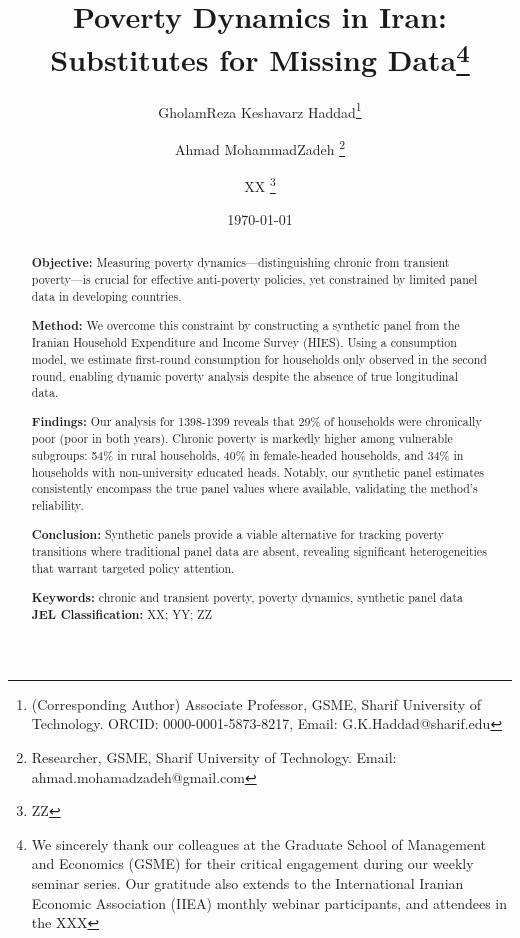 \documentclass[12pt,a4paper]{article}
\title{Poverty Dynamics in Iran: Substitutes for Missing Data\thanks{We sincerely thank our colleagues at the Graduate School of Management and Economics (GSME) for their critical engagement during our weekly seminar series. Our gratitude also extends to the International Iranian Economic Association (IIEA) monthly webinar participants, and attendees in the XXX} }
\author{GholamReza Keshavarz Haddad\thanks{(Corresponding Author) Associate Professor, GSME, Sharif University of Technology. ORCID: 0000-0001-5873-8217, Email: G.K.Haddad@sharif.edu} \and Ahmad MohammadZadeh \thanks{Researcher, GSME, Sharif University of Technology. Email: ahmad.mohamadzadeh@gmail.com} \and XX \thanks{ZZ} }
\date{\today} %
\begin{document}
\maketitle

\begin{abstract}
\noindent
\textbf{Objective:} Measuring poverty dynamics---distinguishing chronic from transient poverty---is crucial for effective anti-poverty policies, yet constrained by limited panel data in developing countries.

\textbf{Method:} We overcome this constraint by constructing a synthetic panel from the Iranian Household Expenditure and Income Survey (HIES). Using a consumption model, we estimate first-round consumption for households only observed in the second round, enabling dynamic poverty analysis despite the absence of true longitudinal data.

\textbf{Findings:} Our analysis for 1398-1399 reveals that 29\% of households were chronically poor (poor in both years). Chronic poverty is markedly higher among vulnerable subgroups: 54\% in rural households, 40\% in female-headed households, and 34\% in households with non-university educated heads. Notably, our synthetic panel estimates consistently encompass the true panel values where available, validating the method's reliability.

\textbf{Conclusion:} Synthetic panels provide a viable alternative for tracking poverty transitions where traditional panel data are absent, revealing significant heterogeneities that warrant targeted policy attention.

\smallskip

\noindent \textbf{Keywords:} chronic and transient poverty, poverty dynamics, synthetic panel data\\
\textbf{JEL Classification:} XX; YY; ZZ
\end{abstract}
\end{document}
